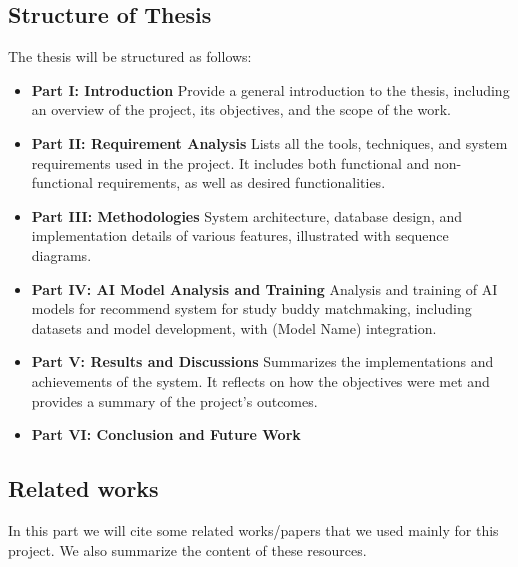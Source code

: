 \documentclass{article}
\begin{document}
\subsection{Structure of Thesis}
The thesis will be structured as follows:
\begin{itemize}
    \item \textbf{Part I: Introduction }
    \newline
    Provide a general introduction to the thesis, including an overview of the project, its objectives, and the scope of the work.
    \item \textbf{Part II: Requirement Analysis }
    \newline
    Lists all the tools, techniques, and system requirements used in the project. It includes
    both functional and non-functional requirements, as well as desired functionalities.
    \item \textbf{Part III: Methodologies }
    \newline
    System architecture, database design, and implementation details of various features, illustrated with sequence diagrams.
    \item \textbf{Part IV: AI Model Analysis and Training }
    \newline
    Analysis and training of AI models for recommend system for study buddy matchmaking, including datasets and model development, with (Model Name) integration.
    \item \textbf{Part V: Results and Discussions }
    \newline 
    Summarizes the implementations and achievements of the system. It reflects on how the
    objectives were met and provides a summary of the project's outcomes.
    \item \textbf{Part VI: Conclusion and Future Work }
    \newline
\end{itemize}


\subsection{Related works}

In this part we will cite some related works/papers that we used mainly for this 
project. We also summarize the content of these resources.


\end{document}
